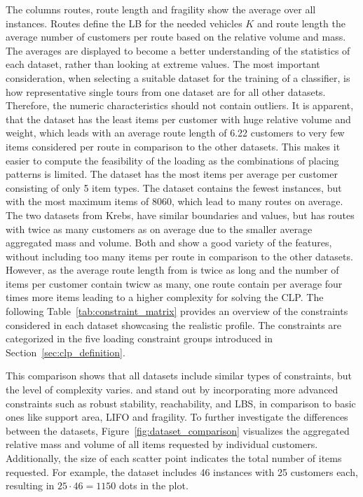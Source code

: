 

The columns routes, route length and fragility show the average over all instances.
Routes define the \gls{LB} for the needed vehicles $K$ and route length the average number of customers per route based
on the relative volume and mass. The averages are displayed to become a better understanding of the
statistics of each dataset, rather than looking at extreme values.
The most important consideration, when selecting a suitable dataset for the training of a classifier,
is how representative single tours from one dataset are for all other datasets. Therefore, the numeric characteristics
should not contain outliers. It is apparent, that the \gendreauDataSetText dataset has the least items per customer
with huge relative volume and weight, which leads with an average route length of 6.22 customers to very few items
considered per route in comparison to the other datasets. This makes it easier to compute the feasibility of the loading
as the combinations of placing patterns is limited. The \mouraDataSetText dataset has the most items per average per customer consisting
of only 5 item types. The \ceschiaDataSetText dataset contains the fewest instances, but with the most maximum items of 8060,
which lead to many routes on average. The two datasets from Krebs, have similar
boundaries and values, but \krebsBDataSetText has routes with twice as many customers as \krebsADataSetText on average due
to the smaller average aggregated mass and volume. Both \krebsADataSetText and \gendreauDataSetText
show a good variety of the features, without including too many items per route in comparison to the other datasets.
However, as the average route length from \krebsADataSetText is twice as long and the number of items per customer contain twicw as many,
one route contain per average four times more items leading to a higher complexity for solving the \gls{CLP}.
The following Table~\ref{tab:constraint_matrix} provides an overview of the constraints considered
in each dataset showcasing the realistic profile. The constraints are categorized in the five loading constraint groups introduced
in Section~\ref{sec:clp_definition}.
\clearpage


This comparison shows that all datasets include similar types of constraints, but the level
of complexity varies. \krebsADataSetText and \ceschiaDataSetText stand out by incorporating
more advanced constraints such as robust stability, reachability, and \gls{LBS}, in comparison to
basic ones like support area, \gls{LIFO} and fragility. To further investigate the differences
between the datasets, Figure~\ref{fig:dataset_comparison} visualizes the aggregated relative mass and
volume of all items requested by individual customers.
Additionally, the size of each scatter point indicates the total number of items requested.
For example, the \mouraDataSetText dataset includes 46
instances with 25 customers each, resulting in $25 \cdot 46 = 1150$ dots in the plot.

